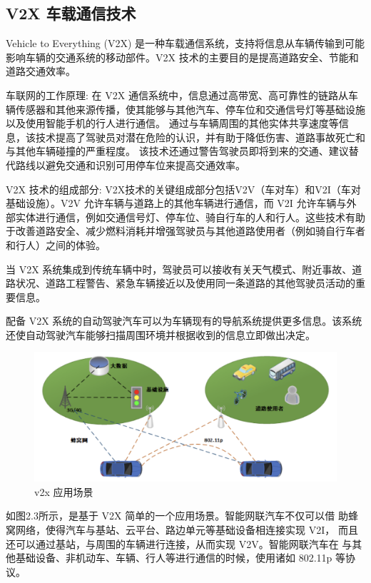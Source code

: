 \subsection{V2X 车载通信技术}

Vehicle to Everything (V2X) 是一种车载通信系统，支持将信息从车辆传输到可能影响车辆的交通系统的移动部件。V2X 技术的主要目的是提高道路安全、节能和道路交通效率。

车联网的工作原理: 在 V2X 通信系统中，信息通过高带宽、高可靠性的链路从车辆传感器和其他来源传播，使其能够与其他汽车、停车位和交通信号灯等基础设施以及使用智能手机的行人进行通信。
通过与车辆周围的其他实体共享速度等信息，该技术提高了驾驶员对潜在危险的认识，并有助于降低伤害、道路事故死亡和与其他车辆碰撞的严重程度。
该技术还通过警告驾驶员即将到来的交通、建议替代路线以避免交通和识别可用停车位来提高交通效率。

V2X 技术的组成部分:
V2X技术的关键组成部分包括V2V（车对车）和V2I（车对基础设施）。V2V 允许车辆与道路上的其他车辆进行通信，而 V2I 允许车辆与外部实体进行通信，例如交通信号灯、停车位、骑自行车的人和行人。这些技术有助于改善道路安全、减少燃料消耗并增强驾驶员与其他道路使用者（例如骑自行车者和行人）之间的体验。

当 V2X 系统集成到传统车辆中时，驾驶员可以接收有关天气模式、附近事故、道路状况、道路工程警告、紧急车辆接近以及使用同一条道路的其他驾驶员活动的重要信息。

配备 V2X 系统的自动驾驶汽车可以为车辆现有的导航系统提供更多信息。该系统还使自动驾驶汽车能够扫描周围环境并根据收到的信息立即做出决定。
\begin{figure}
    \centering
    \includegraphics[scale=0.6]{resources/img/i3.png}
    \caption{v2x 应用场景}
  \end{figure}
\newline
如图2.3所示，是基于 V2X 简单的一个应用场景。智能网联汽车不仅可以借
助蜂窝网络，使得汽车与基站、云平台、路边单元等基础设备相连接实现 V2I，
而且还可以通过基站，与周围的车辆进行连接，从而实现 V2V。智能网联汽车在
与其他基础设备、非机动车、车辆、行人等进行通信的时候，使用诸如 802.11p
等协议。

